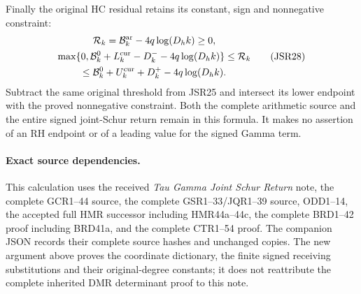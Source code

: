 \documentclass[11pt,a4paper]{article}
\begin{document}
Finally the original HC residual retains its constant,
sign and nonnegative constraint:
\[
\begin{gathered}
 \mathcal R_k=\mathcal B_k^{\rm ar}-4q\log(D_hk)\geq0,\\
 \max\{0,\mathcal B_k^0+L_k^{\rm cur}-D_k^-
                         -4q\log(D_hk)\}
 \leq\mathcal R_k\\
 \leq\mathcal B_k^0+U_k^{\rm cur}+D_k^+
                         -4q\log(D_hk).
\end{gathered}\tag{JSR28}
\]
Subtract the same original threshold from JSR25 and
intersect its lower endpoint with the proved nonnegative
constraint. Both the complete arithmetic source and the
entire signed joint-Schur return remain in this formula.
It makes no assertion of an RH endpoint or of a leading
value for the signed Gamma term.

\paragraph{Exact source dependencies.}
This calculation uses the received \emph{Tau Gamma Joint
Schur Return} note, the complete GCR1--44 source, the complete
GSR1--33/JQR1--39 source, ODD1--14, the accepted full
HMR successor including HMR44a--44c, the complete BRD1--42
proof including BRD41a, and the complete CTR1--54 proof. The companion JSON
records their complete source hashes and unchanged copies.
The new argument above proves the coordinate dictionary,
the finite signed receiving substitutions and their
original-degree constants; it does not reattribute the
complete inherited DMR determinant proof to this note.
\end{document}
